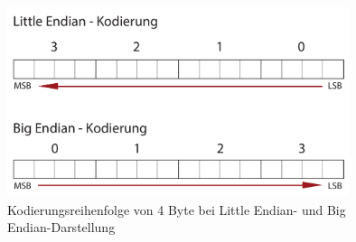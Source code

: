 \begin{figure}[htbp]
  \vspace{0.5cm}
  \centering
  \includegraphics[angle=0,width=10cm]{./img/byteorder.pdf}
  \caption{Kodierungsreihenfolge von 4 Byte bei Little Endian- und Big Endian-Darstellung}
  \label{byteorder}
  \vspace{0.5cm}
\end{figure}


